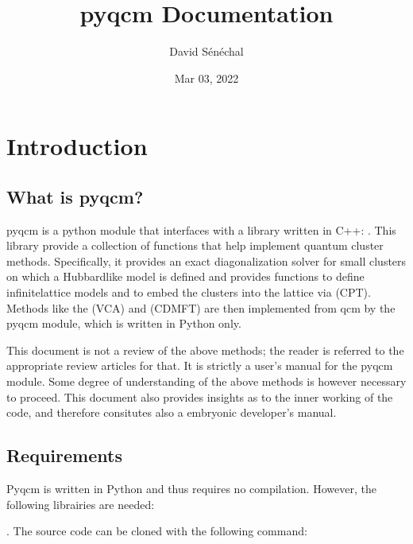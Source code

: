 \documentclass[letterpaper,10pt,english]{sphinxmanual}
\title{pyqcm Documentation}
\date{Mar 03, 2022}
\author{David Sénéchal}
\begin{document}
\pagestyle{empty}
\sphinxmaketitle
\pagestyle{plain}
\sphinxtableofcontents
\pagestyle{normal}
\label{\detokenize{index::doc}}



\chapter{Introduction}
\label{\detokenize{intro:introduction}}\label{\detokenize{intro::doc}}

\section{What is pyqcm?}
\label{\detokenize{intro:what-is-pyqcm}}
\sphinxAtStartPar
pyqcm is a python module that interfaces with a library written in C++: .
This library provide a collection of functions that help implement quantum cluster methods.
Specifically, it provides an exact diagonalization solver for small clusters on which a Hubbard\sphinxhyphen{}like model is defined and provides functions to define infinite\sphinxhyphen{}lattice models and to embed the clusters into the lattice via  (CPT). Methods like the  (VCA) and  (CDMFT) are then implemented from qcm by the pyqcm module, which is written in Python only.

\sphinxAtStartPar
This document is not a review of the above methods; the reader is referred to the appropriate review articles for that. It is strictly a user’s manual for the pyqcm module.
Some degree of understanding of the above methods is however necessary to proceed.
This document also provides insights as to the inner working of the code, and therefore consitutes also a embryonic developer’s manual.


\section{Requirements}
\label{\detokenize{intro:requirements}}
\sphinxAtStartPar
Pyqcm is written in Python and thus requires no compilation.
However, the following librairies are needed:

\sphinxAtStartPar
{}. The source code can be cloned with the following command:

\begin{sphinxVerbatim}[commandchars=\\\{\}]
  
\end{sphinxVerbatim}
\end{document}
